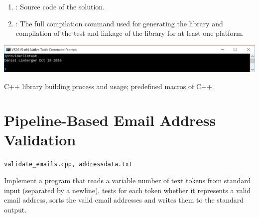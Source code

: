 \documentclass{cgsblatt}
\begin{document}
\begin{enumerate}
	\item {} : Source code of the solution.
   	\item {} : The full compilation command used for generating the library and compilation of the test and linkage of the library for at least one platform.
\end{enumerate}


\hspace{\leftmargin}\includegraphics[width=\linewidth-\leftmargin]{providerlibtest}

C++ library building process and usage; predefined macros of C++. 




\section{Pipeline-Based Email Address Validation}

\verb|validate_emails.cpp, addressdata.txt |

Implement a program that 
reads a variable number of text tokens from standard input (separated by a newline), 
tests for each token whether it represents a valid email address, sorts the valid email addresses
and writes them to the standard output. 
\end{document}
